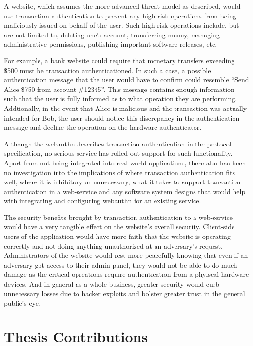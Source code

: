 A website, which assumes the more advanced threat model as described, would use transaction authentication to prevent any high-risk operations from being maliciously issued on behalf of the user. Such high-risk operations include, but are not limited to, deleting one's account, transferring money, managing administrative permissions, publishing important software releases, etc. 

For example, a bank website could require that monetary transfers exceeding \$500 must be transaction authenticationed. In such a case, a possible authentication message that the user would have to confirm could resemble ``Send Alice \$750 from account \#12345''. This message contains enough information such that the user is fully informed as to what operation they are performing. Addtionally, in the event that Alice is malicious and the transaction was actually intended for Bob, the user should notice this discrepancy in the authentication message and decline the operation on the hardware authenticator. 


Although the webauthn describes transaction authentication in the protocol specification, no serious service has rolled out support for such functionality. Apart from not being integrated into real-world applications, there also has been no investigation into the implications of where transaction authentication fits well, where it is inhibitory or unnecessary, what it takes to support transaction authentication in a web-service and any software system designs that would help with integrating and configuring webauthn for an existing service.

The security benefits brought by transaction authentication to a web-service would have a very tangible effect on the website's overall security. Client-side users of the application would have more faith that the website is operating correctly and not doing anything unauthorized at an adversary's request. Administrators of the website would rest more peacefully knowing that even if an adversary got access to their admin panel, they would not be able to do much damage as the critical opreations require authentication from a phyiscal hardware devices. And in general as a whole business, greater security would curb unnecessary losses due to hacker exploits and bolster greater trust in the general public's eye.

\section{Thesis Contributions}

